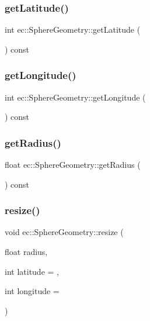 \subsubsection{\texorpdfstring{get\+Latitude()}{getLatitude()}}
{\footnotesize\ttfamily int ec\+::\+Sphere\+Geometry\+::get\+Latitude (\begin{DoxyParamCaption}{ }\end{DoxyParamCaption}) const}

\mbox{\label{classec_1_1_sphere_geometry_a57803f9dc144ba93a300091561a93f07}} 
\subsubsection{\texorpdfstring{get\+Longitude()}{getLongitude()}}
{\footnotesize\ttfamily int ec\+::\+Sphere\+Geometry\+::get\+Longitude (\begin{DoxyParamCaption}{ }\end{DoxyParamCaption}) const}

\mbox{\label{classec_1_1_sphere_geometry_a297fbaec8341dbb2dd0023b0d90d4e24}} 
\subsubsection{\texorpdfstring{get\+Radius()}{getRadius()}}
{\footnotesize\ttfamily float ec\+::\+Sphere\+Geometry\+::get\+Radius (\begin{DoxyParamCaption}{ }\end{DoxyParamCaption}) const}

\mbox{\label{classec_1_1_sphere_geometry_a44eb0096b6f9c6a98a7c325032c04c41}} 
\subsubsection{\texorpdfstring{resize()}{resize()}}
{\footnotesize\ttfamily void ec\+::\+Sphere\+Geometry\+::resize (\begin{DoxyParamCaption}\item[{float}]{radius,  }\item[{int}]{latitude = {},  }\item[{int}]{longitude = {} }\end{DoxyParamCaption})}



